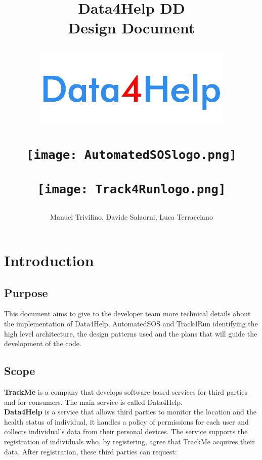 \documentclass[a4paper]{article}
\begin{document}
\author{Manuel Trivilino, Davide Salaorni, Luca Terracciano}

\title{\Large \textbf{Data4Help DD}\\
\textbf{Design Document}
    \begin{figure}[h]
        \centering
        \includegraphics[width=270pt]{data4helpblu}
        \label{fig:my_label_1}
    \end{figure}
    \vspace{-2.4cm}
    \begin{figure}[h]
        \centering
        \texttt{[image: AutomatedSOSlogo.png]}
        \label{fig:my_label_2}
    \end{figure}
    \vspace{-2cm}
    \begin{figure}[h]
        \centering
        \texttt{[image: Track4Runlogo.png]}
        \label{fig:my_label_3}
\end{figure}
}

\maketitle
\newpage

\tableofcontents
\newpage

\section{Introduction}

\subsection{Purpose}
This document aims to give to the developer team more technical details about the implementation of Data4Help, AutomatedSOS and Track4Run identifying the high level architecture, the design patterns used and the plans that will guide the development of the code.
\vspace{.5 cm}

\subsection{Scope}
\textbf{TrackMe} is a company that develops software-based services for third parties and for consumers. The main service is called Data4Help. \\
\textbf{Data4Help} is a service that allows third parties to monitor the location and the health status of individual, it handles a policy of permissions for each user and collects individual’s data from their personal devices.
The service supports the registration of individuals who, by registering, agree that TrackMe acquires their data. After registration, these third parties can request:
\end{document}

